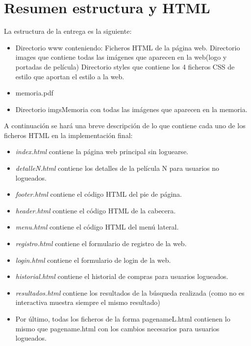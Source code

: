 \documentclass[]{article}
\begin{document}
\section{Resumen estructura y HTML}
La estructura de la entrega es la siguiente:
\begin{itemize}
	\item Directorio www conteniendo:
	\subitem Ficheros HTML de la página web.
	\subitem Directorio images que contiene todas las imágenes que aparecen en la web(logo y portadas de película)
	\subitem Directorio styles que contiene los 4 ficheros CSS de estilo que aportan el estilo a la web.
	\item memoria.pdf
	\item Directorio imgsMemoria con todas las imágenes que aparecen en la memoria.
\end{itemize}
A continuación se hará una breve descripción de lo que contiene cada uno de los ficheros HTML en la implementación final:
\begin{itemize}
	\item \textit{index.html} contiene la página web principal sin loguearse.
	\item \textit{detalleN.html} contiene los detalles de la película N para usuarios no logueados.
	\item \textit{footer.html} contiene el código HTML del pie de página.
	\item \textit{header.html} contiene el código HTML de la cabecera.
	\item \textit{menu.html} contiene el código HTML del menú lateral.
	\item \textit{registro.html} contiene el formulario de registro de la web.
	\item \textit{login.html} contiene el formulario de login de la web.
	\item \textit{historial.html} contiene el historial de compras para usuarios logueados.
	\item \textit{resultados.html} contiene los resultados de la búsqueda realizada (como no es interactiva muestra siempre el mismo resultado)
	\item Por último, todas los ficheros de la forma pagenameL.html contienen lo mismo que pagename.html con los cambios necesarios para usuarios logueados.
\end{itemize}
\end{document}
